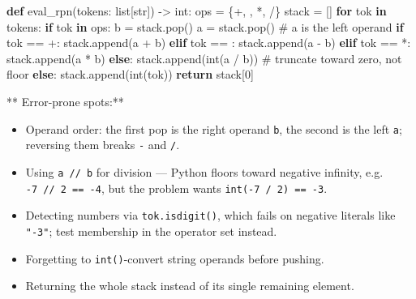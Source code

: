 \documentclass[11pt]{article}
\providecommand{\tightlist}{\setlength{\itemsep}{1pt}\setlength{\parskip}{0pt}}
\newenvironment{Shaded}{\begin{snugshade}}{\end{snugshade}}
\newcommand{\BuiltInTok}[1]{\textcolor[rgb]{0.50,0.55,0.55}{#1}}
\newcommand{\CommentTok}[1]{\textcolor[rgb]{0.48,0.49,0.49}{#1}}
\newcommand{\ControlFlowTok}[1]{\textcolor[rgb]{0.99,0.74,0.29}{\textbf{#1}}}
\newcommand{\DecValTok}[1]{\textcolor[rgb]{0.96,0.45,0.00}{#1}}
\newcommand{\KeywordTok}[1]{\textcolor[rgb]{0.81,0.81,0.76}{\textbf{#1}}}
\newcommand{\NormalTok}[1]{\textcolor[rgb]{0.81,0.81,0.76}{#1}}
\newcommand{\OperatorTok}[1]{\textcolor[rgb]{0.81,0.81,0.76}{#1}}
\newcommand{\StringTok}[1]{\textcolor[rgb]{0.96,0.31,0.31}{#1}}
\begin{document}
\begin{Shaded}
\begin{Highlighting}[]
\KeywordTok{def}\NormalTok{ eval\_rpn(tokens: }\BuiltInTok{list}\NormalTok{[}\BuiltInTok{str}\NormalTok{]) }\OperatorTok{{-}\textgreater{}} \BuiltInTok{int}\NormalTok{:}
\NormalTok{    ops }\OperatorTok{=}\NormalTok{ \{}\StringTok{\textquotesingle{}+\textquotesingle{}}\NormalTok{, }\StringTok{\textquotesingle{}{-}\textquotesingle{}}\NormalTok{, }\StringTok{\textquotesingle{}*\textquotesingle{}}\NormalTok{, }\StringTok{\textquotesingle{}/\textquotesingle{}}\NormalTok{\}}
\NormalTok{    stack }\OperatorTok{=}\NormalTok{ []}
    \ControlFlowTok{for}\NormalTok{ tok }\KeywordTok{in}\NormalTok{ tokens:}
        \ControlFlowTok{if}\NormalTok{ tok }\KeywordTok{in}\NormalTok{ ops:}
\NormalTok{            b }\OperatorTok{=}\NormalTok{ stack.pop()}
\NormalTok{            a }\OperatorTok{=}\NormalTok{ stack.pop()                 }\CommentTok{\# a is the left operand}
            \ControlFlowTok{if}\NormalTok{ tok }\OperatorTok{==} \StringTok{\textquotesingle{}+\textquotesingle{}}\NormalTok{:}
\NormalTok{                stack.append(a }\OperatorTok{+}\NormalTok{ b)}
            \ControlFlowTok{elif}\NormalTok{ tok }\OperatorTok{==} \StringTok{\textquotesingle{}{-}\textquotesingle{}}\NormalTok{:}
\NormalTok{                stack.append(a }\OperatorTok{{-}}\NormalTok{ b)}
            \ControlFlowTok{elif}\NormalTok{ tok }\OperatorTok{==} \StringTok{\textquotesingle{}*\textquotesingle{}}\NormalTok{:}
\NormalTok{                stack.append(a }\OperatorTok{*}\NormalTok{ b)}
            \ControlFlowTok{else}\NormalTok{:}
\NormalTok{                stack.append(}\BuiltInTok{int}\NormalTok{(a }\OperatorTok{/}\NormalTok{ b))    }\CommentTok{\# truncate toward zero, not floor}
        \ControlFlowTok{else}\NormalTok{:}
\NormalTok{            stack.append(}\BuiltInTok{int}\NormalTok{(tok))}
    \ControlFlowTok{return}\NormalTok{ stack[}\DecValTok{0}\NormalTok{]}
\end{Highlighting}
\end{Shaded}

** Error-prone spots:**

\begin{itemize}
\tightlist
\item
  Operand order: the first pop is the right operand \texttt{b}, the second is the left \texttt{a}; reversing them breaks \texttt{-} and \texttt{/}.
\item
  Using \texttt{a\ //\ b} for division --- Python floors toward negative infinity, e.g. \texttt{-7\ //\ 2\ ==\ -4}, but the problem wants \texttt{int(-7\ /\ 2)\ ==\ -3}.
\item
  Detecting numbers via \texttt{tok.isdigit()}, which fails on negative literals like \texttt{"-3"}; test membership in the operator set instead.
\item
  Forgetting to \texttt{int()}-convert string operands before pushing.
\item
  Returning the whole stack instead of its single remaining element.
\end{itemize}
\end{document}
